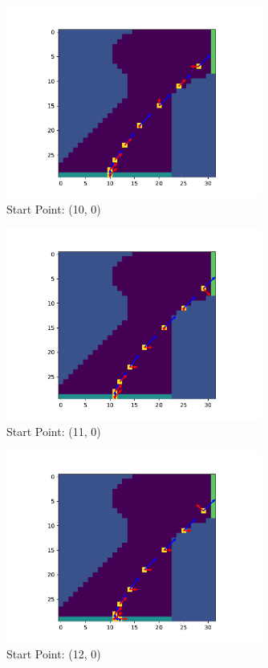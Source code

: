 \documentclass{article}
\begin{document}
\begin{figure}[H]
	\centering
	\includegraphics[width=0.75\textwidth]{../figure/fig_10}
	\caption{Start Point: (10, 0)}
	\label{fig:fig_10}
\end{figure}


\begin{figure}[H]
	\centering
	\includegraphics[width=0.75\textwidth]{../figure/fig_11}
	\caption{Start Point: (11, 0)}
	\label{fig:fig_11}
\end{figure}


\begin{figure}[H]
	\centering
	\includegraphics[width=0.75\textwidth]{../figure/fig_12}
	\caption{Start Point: (12, 0)}
	\label{fig:fig_12}
\end{figure}
\end{document}
